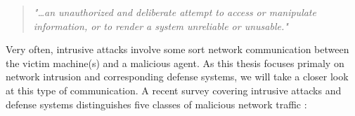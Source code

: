 \begin{quote}
\textit{"\dots an unauthorized and deliberate attempt to access or manipulate information, or to render a system unreliable or unusable."}
\end{quote}

Very often, intrusive attacks involve some sort network communication between the victim machine(s) and a malicious agent. As this thesis focuses primaly on network intrusion and corresponding defense systems, we will take a closer look at this type of communication. A recent survey covering intrusive attacks and defense systems distinguishes five classes of malicious network traffic \cite{nisioti2018intrusion}:

